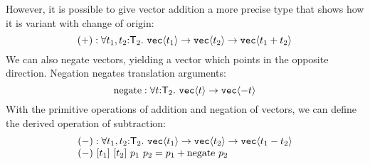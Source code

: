 However, it is possible to give vector addition a more precise type
that shows how it is variant with change of origin:
\begin{displaymath}
  (+) : \forall t_1, t_2 \mathord: \SynTransl{2}.\ \tyPrim{vec}{t_1} \to \tyPrim{vec}{t_2} \to \tyPrim{vec}{t_1 + t_2}
\end{displaymath}
We can also negate vectors, yielding a vector which points in the
opposite direction. Negation negates translation arguments:
\begin{displaymath}
  \mathrm{negate} : \forall t \mathord: \mathsf{T}_2.\ \texttt{vec}\langle t \rangle \to \texttt{vec}\langle -t \rangle
\end{displaymath}
With the primitive operations of addition and negation of vectors, we
can define the derived operation of subtraction:
\begin{displaymath}
  \begin{array}{l}
    (-) : \forall t_1,t_2 \mathord:\mathsf{T}_2.\ \texttt{vec}\langle t_1 \rangle \to \texttt{vec}\langle t_2 \rangle \to \texttt{vec}\langle t_1 - t_2 \rangle \\
    (-)\ [t_1]\ [t_2]\ p_1\ p_2 = p_1 + \mathrm{negate}\ p_2
  \end{array}
\end{displaymath}

